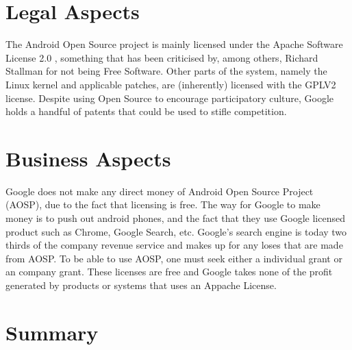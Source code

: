\documentclass[conference]{IEEEtran}
\begin{document}
\section{Legal Aspects}
\label{legal}

The Android Open Source project is mainly licensed under the Apache Software License 2.0 \cite{apache-license}, something that has been criticised by, among others, Richard Stallman for not being Free Software\cite{rms-android}. Other parts of the system, namely the Linux kernel and applicable patches, are (inherently) licensed with the GPLV2 license\cite{gplv2}\cite{android-licenses}. Despite using Open Source to encourage participatory culture, Google holds a handful of patents that could be used to stifle competition\cite{google-slide-unlock}\cite{google-radial-menu}.


\section{Business Aspects}
\label{financial}

Google does not make any direct money of Android Open Source Project (AOSP), due to the fact that licensing is free.\cite{Money} The way for Google to make money is to push out android phones, and the fact that they use Google licensed product such as Chrome, Google Search, etc. Google's search engine is today two thirds of the company revenue service and makes up for any loses that are made from AOSP. To be able to use AOSP, one must seek either a individual grant or an company grant. \cite{android-licenses} These licenses are free and Google takes none of the profit generated by products or systems that uses an Appache License.


\section{Summary}
\end{document}
